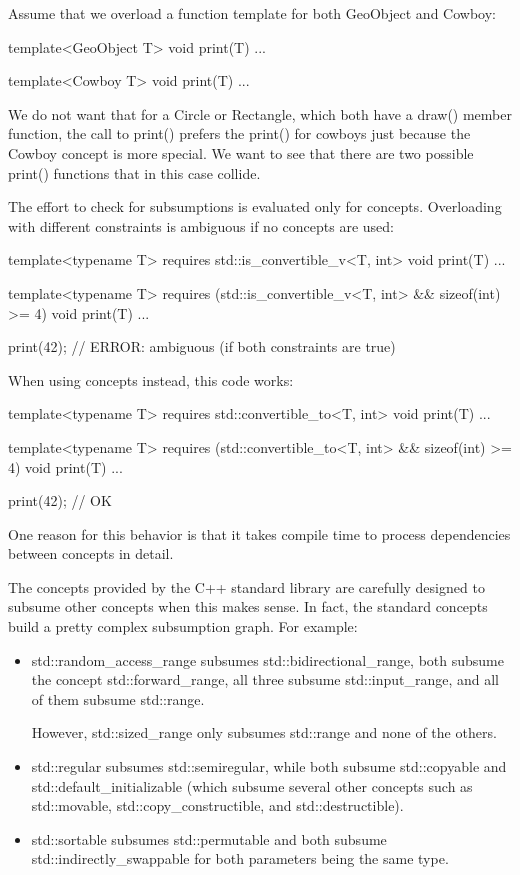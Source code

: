 Assume that we overload a function template for both GeoObject and Cowboy:

\begin{cpp}
template<GeoObject T>
void print(T) {
	...
}

template<Cowboy T>
void print(T) {
	...
}
\end{cpp}

We do not want that for a Circle or Rectangle, which both have a draw() member function, the call to print() prefers the print() for cowboys just because the Cowboy concept is more special. We want to see that there are two possible print() functions that in this case collide.

The effort to check for subsumptions is evaluated only for concepts. Overloading with different constraints is ambiguous if no concepts are used:

\begin{cpp}
template<typename T>
requires std::is_convertible_v<T, int>
void print(T) {
	...
}

template<typename T>
requires (std::is_convertible_v<T, int> && sizeof(int) >= 4)
void print(T) {
	...
}

print(42); // ERROR: ambiguous (if both constraints are true)
\end{cpp}

When using concepts instead, this code works:

\begin{cpp}
template<typename T>
requires std::convertible_to<T, int>
void print(T) {
	...
}

template<typename T>
requires (std::convertible_to<T, int> && sizeof(int) >= 4)
void print(T) {
	...
}

print(42); // OK
\end{cpp}

One reason for this behavior is that it takes compile time to process dependencies between concepts in detail.

The concepts provided by the C++ standard library are carefully designed to subsume other concepts when this makes sense. In fact, the standard concepts build a pretty complex subsumption graph. For example:

\begin{itemize}
\item
std::random\_access\_range subsumes std::bidirectional\_range, both subsume the concept std::forward\_range, all three subsume std::input\_range, and all of them subsume std::range.

However, std::sized\_range only subsumes std::range and none of the others.

\item
std::regular subsumes std::semiregular, while both subsume std::copyable and std::default\_initializable (which subsume several other concepts such as std::movable, std::copy\_constructible, and std::destructible).

\item
std::sortable subsumes std::permutable and both subsume std::indirectly\_swappable for both parameters being the same type.
\end{itemize}

